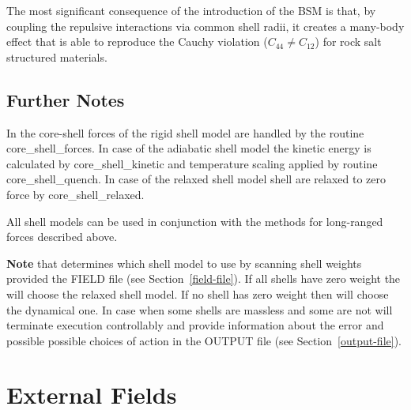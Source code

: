 The most significant consequence of the introduction of the BSM is that,
by coupling the repulsive interactions via common shell radii, it creates
a many-body effect that is able to reproduce the Cauchy violation
($C_{44} \ne C_{12}$) for rock salt structured materials.

\subsection{Further Notes}

In \D the core-shell forces of the rigid shell model are handled
by the routine {\sc core\_shell\_forces}.  In case of the adiabatic
shell model the kinetic energy is calculated by {\sc core\_shell\_kinetic}
and temperature scaling applied by routine {\sc core\_shell\_quench}.
In case of the relaxed shell model shell are relaxed to zero force
by {\sc core\_shell\_relaxed}.

All shell models can be used in
conjunction with the methods for long-ranged forces described above.

{\bf Note} that \D determines which shell model to use by scanning
shell weights provided the FIELD file (see Section~\ref{field-file}).
If all shells have zero weight the \D will choose the relaxed shell
model.  If no shell has zero weight then \D will choose the dynamical
one.  In case when some shells are massless and some are not \D will
terminate execution controllably and provide information about the
error and possible possible choices of action in the OUTPUT file
(see Section~\ref{output-file}).

\section{External Fields}
\label{external-field}

